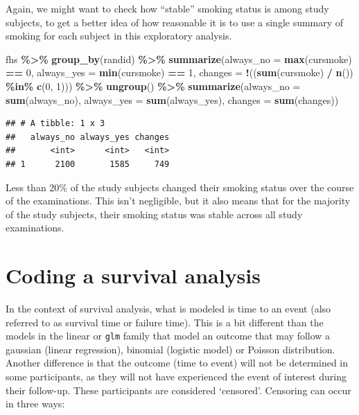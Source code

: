 \documentclass[
]{book}
\newenvironment{Shaded}{\begin{snugshade}}{\end{snugshade}}
\newcommand{\AttributeTok}[1]{\textcolor[rgb]{0.13,0.29,0.53}{#1}}
\newcommand{\DecValTok}[1]{\textcolor[rgb]{0.00,0.00,0.81}{#1}}
\newcommand{\FunctionTok}[1]{\textcolor[rgb]{0.13,0.29,0.53}{\textbf{#1}}}
\newcommand{\NormalTok}[1]{#1}
\newcommand{\SpecialCharTok}[1]{\textcolor[rgb]{0.81,0.36,0.00}{\textbf{#1}}}
\begin{document}
Again, we might want to check how ``stable'' smoking status is among study subjects, to get a better idea of how reasonable it is to use a single summary of smoking for each subject in this exploratory analysis.

\begin{Shaded}
\begin{Highlighting}[]
\NormalTok{fhs }\SpecialCharTok{\%\textgreater{}\%} 
  \FunctionTok{group\_by}\NormalTok{(randid) }\SpecialCharTok{\%\textgreater{}\%} 
  \FunctionTok{summarize}\NormalTok{(}\AttributeTok{always\_no =} \FunctionTok{max}\NormalTok{(cursmoke) }\SpecialCharTok{==} \DecValTok{0}\NormalTok{, }
            \AttributeTok{always\_yes =} \FunctionTok{min}\NormalTok{(cursmoke) }\SpecialCharTok{==} \DecValTok{1}\NormalTok{, }
            \AttributeTok{changes =} \SpecialCharTok{!}\NormalTok{((}\FunctionTok{sum}\NormalTok{(cursmoke) }\SpecialCharTok{/} \FunctionTok{n}\NormalTok{()) }\SpecialCharTok{\%in\%} \FunctionTok{c}\NormalTok{(}\DecValTok{0}\NormalTok{, }\DecValTok{1}\NormalTok{))) }\SpecialCharTok{\%\textgreater{}\%} 
  \FunctionTok{ungroup}\NormalTok{() }\SpecialCharTok{\%\textgreater{}\%} 
  \FunctionTok{summarize}\NormalTok{(}\AttributeTok{always\_no =} \FunctionTok{sum}\NormalTok{(always\_no), }
            \AttributeTok{always\_yes =} \FunctionTok{sum}\NormalTok{(always\_yes), }
            \AttributeTok{changes =} \FunctionTok{sum}\NormalTok{(changes))}
\end{Highlighting}
\end{Shaded}

\begin{verbatim}
## # A tibble: 1 x 3
##   always_no always_yes changes
##       <int>      <int>   <int>
## 1      2100       1585     749
\end{verbatim}

Less than 20\% of the study subjects changed their smoking status over the course of the examinations. This isn't negligible, but it also means that for the majority of the study subjects, their smoking status was stable across all study examinations.

\section{Coding a survival analysis}\label{coding-a-survival-analysis}

In the context of survival analysis, what is modeled is time to an event (also referred to as survival time or failure time). This is a bit different than the models in the linear or \texttt{glm} family that model an outcome that may follow a gaussian (linear regression), binomial (logistic model) or Poisson distribution. Another difference is that the outcome (time to event) will not be determined in some participants, as they will not have experienced the event of interest during their follow-up. These participants are considered `censored'. Censoring can occur in three ways:
\end{document}
